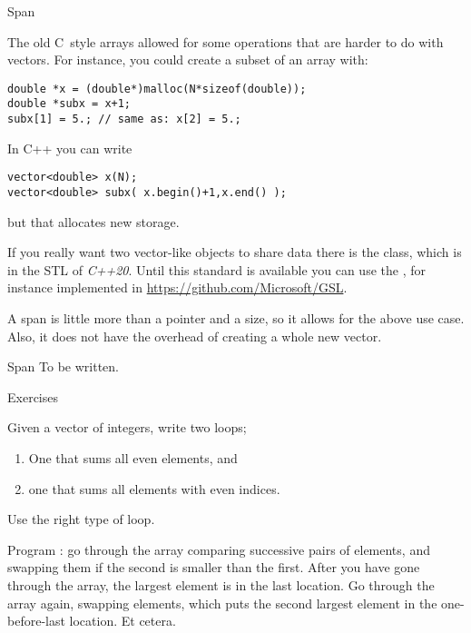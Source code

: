  {Span}
\label{sec:gsl-span}

The old C~style arrays allowed for some operations that are harder to
do with vectors. For instance, you could create a subset of an array with:
\begin{lstlisting}
double *x = (double*)malloc(N*sizeof(double));
double *subx = x+1;
subx[1] = 5.; // same as: x[2] = 5.;
\end{lstlisting}
In C++ you can write
\begin{lstlisting}
vector<double> x(N);
vector<double> subx( x.begin()+1,x.end() );
\end{lstlisting}
but that allocates new storage.

If you really want two vector-like objects to share data there is the
 class, which is in the \ac{STL} of
\emph{C++20}. Until this standard is available you
can use the , for instance implemented in
\url{https://github.com/Microsoft/GSL}.

A span is little more than a pointer and a size, so it allows for the
above use case. Also, it does not have the overhead of creating a
whole new vector.

\begin{block}{Span}
  \label{sl:spandef}
  To be written.
\end{block}

 {Exercises}

\begin{exercise}
  Given a vector of integers, write two loops;
  \begin{enumerate}
  \item One that sums all even elements, and
  \item one that sums all elements with even indices.
  \end{enumerate}
  Use the right type of loop.
\end{exercise}

\begin{exercise}
  Program : go through the array comparing
  successive pairs of elements, and swapping them if the second is
  smaller than the first. After you have gone through the array, the
  largest element is in the last location. Go through the array again,
  swapping elements, which puts the second largest element in the
  one-before-last location. Et cetera.
\end{exercise}

